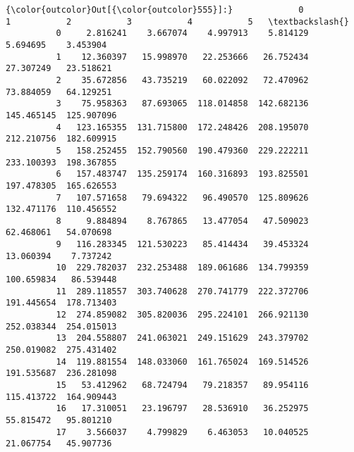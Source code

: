 \documentclass[11pt]{article}
\begin{document}
\begin{Verbatim}[commandchars=\\\{\}]
{\color{outcolor}Out[{\color{outcolor}555}]:}             0           1           2           3           4           5   \textbackslash{}
          0     2.816241    3.667074    4.997913    5.814129    5.694695    3.453904   
          1    12.360397   15.998970   22.253666   26.752434   27.307249   23.518621   
          2    35.672856   43.735219   60.022092   72.470962   73.884059   64.129251   
          3    75.958363   87.693065  118.014858  142.682136  145.465145  125.907096   
          4   123.165355  131.715800  172.248426  208.195070  212.210756  182.609915   
          5   158.252455  152.790560  190.479360  229.222211  233.100393  198.367855   
          6   157.483747  135.259174  160.316893  193.825501  197.478305  165.626553   
          7   107.571658   79.694322   96.490570  125.809626  132.471176  110.456552   
          8     9.884894    8.767865   13.477054   47.509023   62.468061   54.070698   
          9   116.283345  121.530223   85.414434   39.453324   13.060394    7.737242   
          10  229.782037  232.253488  189.061686  134.799359  100.659834   86.539448   
          11  289.118557  303.740628  270.741779  222.372706  191.445654  178.713403   
          12  274.859082  305.820036  295.224101  266.921130  252.038344  254.015013   
          13  204.558807  241.063021  249.151629  243.379702  250.019082  275.431402   
          14  119.881554  148.033060  161.765024  169.514526  191.535687  236.281098   
          15   53.412962   68.724794   79.218357   89.954116  115.413722  164.909443   
          16   17.310051   23.196797   28.536910   36.252975   55.815472   95.801210   
          17    3.566037    4.799829    6.463053   10.040525   21.067754   45.907736   
          

\end{Verbatim}
\end{document}
